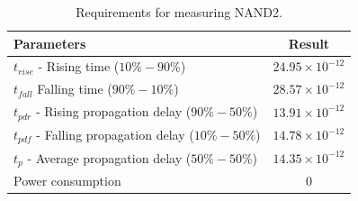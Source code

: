 \begin{table}[H]
	\centering
	\begin{tabular}{|p{.5\linewidth}|c|}
		\hline
		Parameters & Result\\
		\hline
		$t_{rise}$ - Rising time ($10\% - 90\%$) & $24.95\times10^{-12}$\\
		\hline
		$t_{fall}$  Falling time ($90\% - 10\%$) & $28.57\times10^{-12}$\\
		\hline
		$t_{pdr}$ - Rising propagation delay ($90\% - 50\%$) & $13.91\times10^{-12}$\\
		\hline
		$t_{pdf}$ - Falling propagation delay ($10\% - 50\%$) & $14.78\times10^{-12}$\\
		\hline
		$t_{p}$ - Average propagation delay ($50\% - 50\%$) & $14.35\times10^{-12}$\\
		\hline
		Power consumption & $0$\\
		\hline
	\end{tabular}
	\caption{Requirements for measuring NAND2.}
	\label{f_measuring NAND2}
\end{table}

